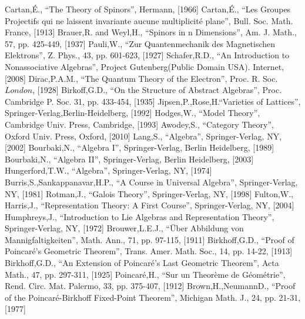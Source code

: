 \documentclass[aps,twocolumn,secnumarabic,nobalancelastpage,amsmath,amssymb,
amsthm,nofootinbib,parskip=full]{revtex4}
\begin{document}

\begin{thebibliography}{99}
Cartan,\'{E}., ``The Theory of Spinors'', Hermann, [1966]
Cartan,\'{E}., ``Les Groupes Projectifs qui ne laissent
  invariante aucune multiplicit\'{e} plane'', Bull. Soc. Math. France, [1913]
Brauer,R. and Weyl,H., ``Spinors in n Dimensions'', Am. J. Math., 57, pp. 425-449, [1937]
Pauli,W., ``Zur Quantenmechanik des Magnetischen Elektrons'', Z. Phys., 43, pp. 601-623, [1927]
Schafer,R.D., ``An Introduction to Nonassociative Algebras'', Project Gutenberg(Public Domain USA). Internet, [2008]
Dirac,P.A.M., ``The Quantum Theory of the Electron'', Proc. R. Soc. \(London\), [1928]
Birkoff,G.D., ``On the Structure of Abstract Algebras'', Proc. Cambridge P. Soc. 31, pp. 433-454, [1935]
Jipsen,P.,Rose,H.``Varieties of Lattices'', Springer-Verlag,Berlin-Heidelberg, [1992]
Hodges,W., ``Model Theory'', Cambridge Univ. Press, Cambridge, [1993]
Awodey,S., ``Category Theory'', Oxford Univ. Press, Oxford, [2010]
Lang,S., ``Algebra'', Springer-Verlag, NY, [2002]
Bourbaki,N., ``Algebra I'', Springer-Verlag, Berlin Heidelberg, [1989]
Bourbaki,N., ``Algebra II'', Springer-Verlag, Berlin Heidelberg, [2003]
Hungerford,T.W., ``Algebra'', Springer-Verlag, NY, [1974]
Burris,S.,Sankappanavar,H.P., ``A Course in Universal Algebra'', Springer-Verlag, NY, [1981]
Rotman,J., ``Galois Theory'', Springer-Verlag, NY, [1998]
Fulton,W., Harris,J., ``Representation Theory: A First Course'', Springer-Verlag, NY, [2004]
Humphreys,J., ``Introduction to Lie Algebras and Representation Theory'', Springer-Verlag, NY, [1972]
Brouwer,L.E.J., ``\"Uber Abbildung von Mannigfaltigkeiten'', Math. Ann., 71, pp. 97-115, [1911]
Birkhoff,G.D., ``Proof of Poincar\'e's Geometric Theorem'', Trans. Amer. Math. Soc., 14, pp. 14-22, [1913]
Birkhoff,G.D., ``An Extension of Poincar\'e's Last Geometric Theorem'', Acta Math., 47, pp. 297-311, [1925]
Poincar\'e,H., ``Sur un Theor\`eme de G\'eom\'etrie'', Rend. Circ. Mat. Palermo, 33, pp. 375-407, [1912]
Brown,H.,NeumannD., ``Proof of the Poincar\'e-Birkhoff Fixed-Point Theorem'', Michigan Math. J., 24, pp. 21-31, [1977]

\end{thebibliography}
\end{document}
